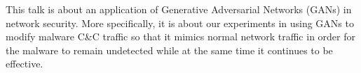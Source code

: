 \def\abstracttitle{Arming malware with GANs}
\def\abstractcomment{Short Talk}
\def\abstractowner{Maria Rigaki}

\thispagestyle{abstract}

This talk is about an application of Generative Adversarial Networks (GANs) in network security. More specifically, it is about our experiments in using GANs to modify malware C\&C traffic so that it mimics normal network traffic in order for the malware to remain undetected while at the same time it continues to be effective.
